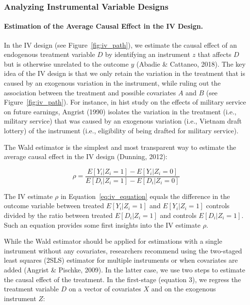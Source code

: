 \documentclass[english]{article}
\begin{document}
\subsubsection{Analyzing Instrumental Variable Designs}

\paragraph{Estimation of the Average Causal Effect in the IV
Design.}

In the IV design (see Figure~\ref{fig:iv_path}), we estimate the causal effect
of an endogenous treatment variable $D$ by identifying an instrument $z$ that
affects $D$ but is otherwise unrelated to the outcome $y$ (Abadie \& Cattaneo,
2018). The key idea of the IV design is that we only retain the variation in
the treatment that is caused by an exogenous variation in the instrument, while
ruling out the association between the treatment and possible covariates $A$
and $B$ (see Figure~\ref{fig:iv_path}). For instance, in hist study on  the
effects of military service on future earnings, Angrist (1990) isolates
the variation in the treatment (i.e., military service) that was
caused by an exogenous variation (i.e., Vietnam draft lottery) of the
instrument (i.e., eligibility of being drafted for military service).

The Wald estimator is the simplest and most transparent way to estimate the average causal
effect in the IV design (Dunning, 2012):

\begin{equation}
	\rho = \frac{E[Y_{i} | Z_{i} = 1] - E[Y_{i} | Z_{i} = 0]}
	{E[D_{i} | Z_{i} = 1] - E[D_{i} | Z_{i} = 0]}
        \label{eq:iv_equation}
\end{equation}

The IV estimate $\rho$ in Equation~\ref{eq:iv_equation} equals the difference
in the outcome variable between treated $E[Y_{i} | Z_{i} = 1]$ and $E[Y_{i} |
Z_{i} = 1]$ controls divided by the ratio between treated $E[D_{i} | Z_{i} =
1]$ and controls $E[D_{i} | Z_{i} = 1]$. Such an equation provides some first
insights into the IV estimate $\rho$.

While the Wald estimator should be applied for estimations with a single
instrument without any covariates, researchers recommend using the
two-staged least squares (2SLS) estimator for multiple instruments or
when covariates are added (Angrist \& Pischke, 2009). In the latter
case, we use two steps to estimate the causal effect of the treatment.
In the first-stage (equation 3), we regress the treatment variable $D$
on a vector of covariates $X$ and on the exogenous instrument $Z$:
\end{document}
